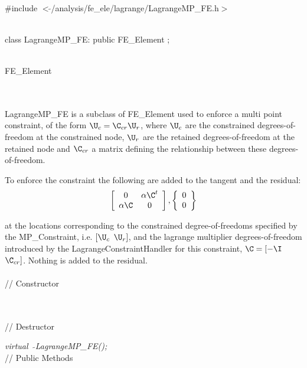 
   \\
\#include $<\tilde{ }$/analysis/fe\_ele/lagrange/LagrangeMP\_FE.h$>$  


  \\
class LagrangeMP\_FE: public FE\_Element ;  


  \\
FE\_Element 

\indent{} \\ 

  \\
\indent LagrangeMP\_FE is a subclass of FE\_Element used to enforce a
multi point constraint, of the form $\U_c = \C_{cr} \U_r$, where $\U_c$ are
the constrained degrees-of-freedom at the constrained node, $\U_r$ are
the retained degrees-of-freedom at the retained node and $\C_{cr}$ a
matrix defining the relationship between these degrees-of-freedom. 

To enforce the constraint the following are added to the tangent and
the residual:
$$ \left[ \begin{array}{cc} 0 & \alpha\C^t \\ \alpha\C & 0 \end{array}
\right] ,
\left\{ \begin{array}{c} 0 \\ 0 \end{array} \right\} $$

\noindent 
\noindent at the locations
corresponding to the constrained degree-of-freedoms specified by the
MP\_Constraint, i.e. $[\U_c$ $\U_r]$, and the lagrange multiplier
degrees-of-freedom introduced by the LagrangeConstraintHandler for
this constraint, $\C = [-\I$ $\C_{cr}]$. Nothing is added to the residual. \\  


  \\
// Constructor  

 \\ \\
// Destructor  

{\em virtual~ $\tilde{}$LagrangeMP\_FE();}  \\ 

// Public Methods 

